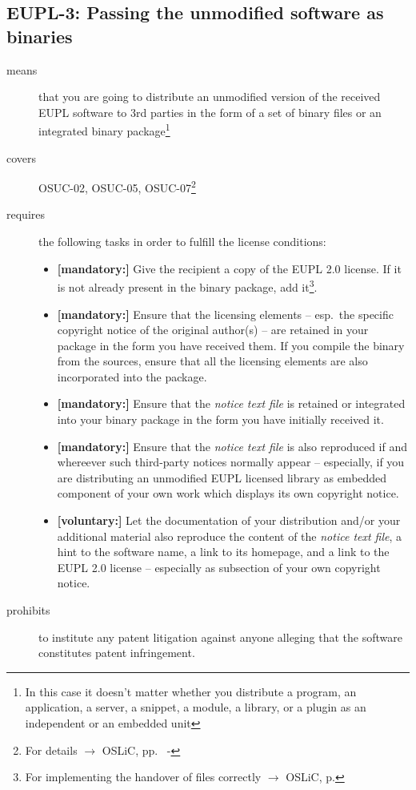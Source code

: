 \subsection{EUPL-3: Passing the unmodified software as binaries} 

\begin{description}
\item[means] that you are going to distribute an unmodified version of the
received EUPL software to 3rd parties in the form of a set of binary files or an
integrated bi\-na\-ry package\footnote{In this case it doesn't matter
whether you  distribute a program, an application, a server, a snippet, a
module, a library, or a plugin as an independent or an embedded unit}

\item[covers] OSUC-02, OSUC-05, OSUC-07\footnote{For details $\rightarrow$ OSLiC, pp.\
\pageref{OSUC-02-DEF} - \pageref{OSUC-07-DEF}}

\item[requires] the following tasks in order to fulfill the license conditions:
\begin{itemize}
  \item \textbf{[mandatory:]} Give the recipient a copy of the EUPL 2.0
  license. If it is not already present in the binary package, add
  it\footnote{For implementing the handover of files correctly $\rightarrow$
  OSLiC, p. \pageref{DistributingFilesHint}}.
  
  \item \textbf{[mandatory:]} Ensure that the licensing elements -- esp.\ the
  specific copyright notice of the original author(s) -- are retained in your
  package in the form you have received them. If you compile the binary from the
  sources, ensure that all the licensing elements are also incorporated into the
  package.
  \item \textbf{[mandatory:]} Ensure that the \emph{notice text file} is
  retained or integrated into your binary package in the form you have initially
  received
  it.
  \item \textbf{[mandatory:]} Ensure that the \emph{notice text file} is also
  reproduced if and whereever such third-party notices normally appear --
  especially, if you are distributing an unmodified EUPL licensed library as
  embedded component of your own work which displays its own copyright notice.
  
  \item \textbf{[voluntary:]} Let the documentation of your distribution and/or
  your additional material also reproduce the content of the \emph{notice text
  file}, a hint to the software name, a link to its homepage, and a link to the
  EUPL 2.0 license -- especially as subsection of your own copyright notice.
\end{itemize}

\item[prohibits] to institute any patent litigation against anyone alleging that
the software constitutes patent infringement.

\end{description}


